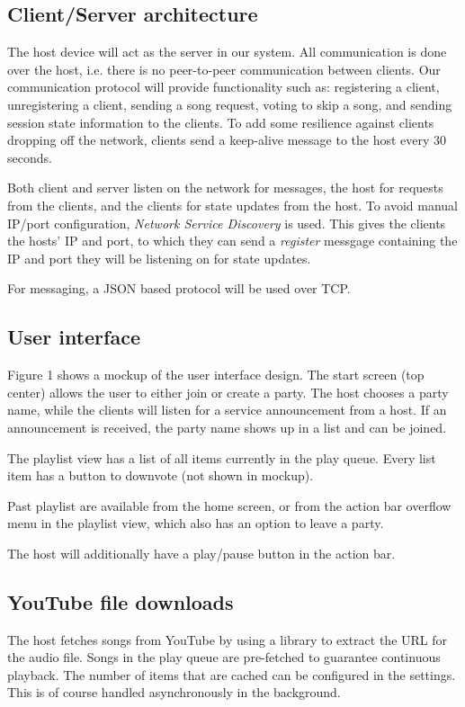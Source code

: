 \documentclass{report}
\begin{document}
\subsection{Client/Server architecture}
The host device will act as the server in our system. All communication is
done over the host, i.e. there is no peer-to-peer communication between
clients. Our communication protocol will provide functionality such as:
registering a client, unregistering a client, sending a song request,
voting to skip a song, and sending session state information to the clients.
To add some resilience against clients dropping off the network,
clients send a keep-alive message to the host every 30 seconds.

Both client and server listen on the network for messages,
the host for requests from the clients, and the clients for state updates
from the host. To avoid manual IP/port configuration, \emph{Network Service Discovery}
\cite{nsd} is used. This gives the clients the hosts' IP and port,
to which they can send a \emph{register} messgage containing the IP and port they
will be listening on for state updates.

For messaging, a JSON based protocol will be used over TCP.

\subsection{User interface}
Figure 1 shows a mockup of the user interface design. The start screen
(top center) allows the user to either join or create a party. The host chooses
a party name, while the clients will listen for a service announcement
from a host. If an announcement is received, the party name shows up
in a list and can be joined.

The playlist view has a list of all items currently in the play queue.
Every list item has a button to downvote (not shown in mockup).

Past playlist are available from the home screen, or from the action bar
overflow menu in the playlist view, which also has an option to leave a party.

The host will additionally have a play/pause button in the action bar.

\subsection{YouTube file downloads}
The host fetches songs from YouTube by using a library \cite{youtubeExtractor}
to extract the URL for the audio file. Songs in the play queue are pre-fetched
to guarantee continuous playback. The number of items that are cached can be
configured in the settings. This is of course handled asynchronously in
the background.
\end{document}
